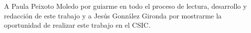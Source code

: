 A Paula Peixoto Moledo por guiarme en todo el proceso de lectura, desarrollo y redacción de este trabajo y a Jesús González Gironda por mostrarme la oportunidad de realizar este trabajo en el CSIC.